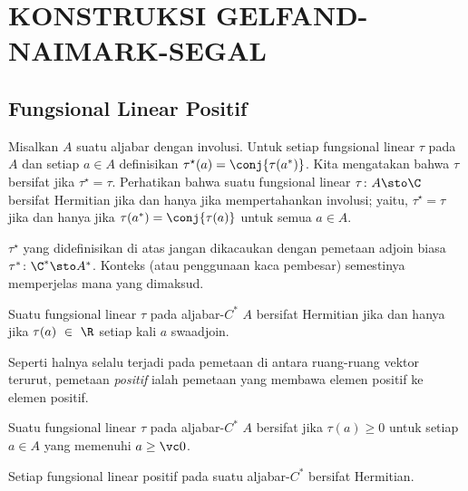 \chapter{KONSTRUKSI GELFAND-NAIMARK-SEGAL}\label{gelfand_naimark_segal}

\section{Fungsional Linear Positif}
\begin{defn} Misalkan $A$ suatu aljabar dengan involusi. Untuk setiap fungsional linear $\tau$ pada
$A$ dan setiap $a \in A$ definisikan
$\tau^\star(a) = \conj{\tau(a^*)}$.  Kita mengatakan bahwa $\tau$ bersifat
 jika $\tau^\star = \tau$.  Perhatikan bahwa suatu fungsional linear $\tau\colon A
\sto \C$ bersifat Hermitian jika dan hanya jika mempertahankan involusi; yaitu, $\tau^\star =
\tau$ jika dan hanya jika $\tau(a^*) = \conj{\tau(a)}$ untuk semua $a \in A$.
\end{defn}

\begin{cau} $\tau^\star$ yang didefinisikan di atas jangan dikacaukan dengan pemetaan adjoin
biasa $\tau^*\colon \C^* \sto A^*$. Konteks (atau penggunaan kaca pembesar) semestinya
memperjelas mana yang dimaksud.
\end{cau}

\begin{prop} Suatu fungsional linear $\tau$ pada aljabar-$C^*$ $A$ bersifat Hermitian jika dan hanya jika
$\tau(a)~\in~\R$ setiap kali $a$ swaadjoin.
\end{prop}

Seperti halnya selalu terjadi pada pemetaan di antara ruang-ruang vektor terurut, pemetaan
\emph{positif} ialah pemetaan yang membawa elemen positif ke elemen positif.

\begin{defn} Suatu fungsional linear $\tau$ pada aljabar-$C^*$ $A$ bersifat
 jika $\tau(a) \ge 0$ untuk setiap $a \in A$ yang memenuhi $a \ge \vc 0$.
\end{defn}


\begin{prop} Setiap fungsional linear positif pada suatu aljabar-$C^*$ bersifat Hermitian.
\end{prop}

